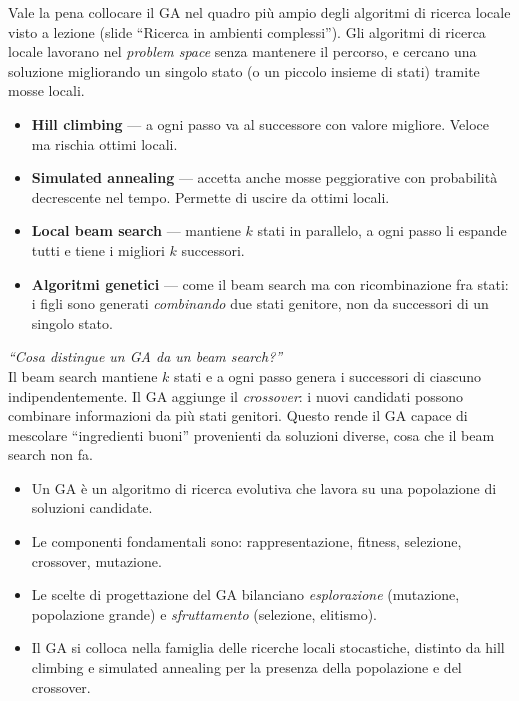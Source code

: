 \documentclass[11pt,a4paper]{article}
\begin{document}
Vale la pena collocare il GA nel quadro più ampio degli algoritmi di
ricerca locale visto a lezione (slide ``Ricerca in ambienti complessi'').
Gli algoritmi di ricerca locale lavorano nel \emph{problem space} senza
mantenere il percorso, e cercano una soluzione migliorando un singolo
stato (o un piccolo insieme di stati) tramite mosse locali.

\begin{itemize}
    \item \textbf{Hill climbing} --- a ogni passo va al successore con
          valore migliore. Veloce ma rischia ottimi locali.
    \item \textbf{Simulated annealing} --- accetta anche mosse peggiorative
          con probabilità decrescente nel tempo. Permette di uscire da
          ottimi locali.
    \item \textbf{Local beam search} --- mantiene $k$ stati in parallelo,
          a ogni passo li espande tutti e tiene i migliori $k$ successori.
    \item \textbf{Algoritmi genetici} --- come il beam search ma con
          ricombinazione fra stati: i figli sono generati \emph{combinando}
          due stati genitore, non da successori di un singolo stato.
\end{itemize}

\begin{domanda}
\textit{``Cosa distingue un GA da un beam search?''}\\
Il beam search mantiene $k$ stati e a ogni passo genera i successori di
ciascuno indipendentemente. Il GA aggiunge il \emph{crossover}: i nuovi
candidati possono combinare informazioni da più stati genitori. Questo
rende il GA capace di mescolare ``ingredienti buoni'' provenienti da
soluzioni diverse, cosa che il beam search non fa.
\end{domanda}

\begin{riassunto}
\begin{itemize}
    \item Un GA è un algoritmo di ricerca evolutiva che lavora su una popolazione di soluzioni candidate.
    \item Le componenti fondamentali sono: rappresentazione, fitness, selezione, crossover, mutazione.
    \item Le scelte di progettazione del GA bilanciano \emph{esplorazione} (mutazione, popolazione grande) e \emph{sfruttamento} (selezione, elitismo).
    \item Il GA si colloca nella famiglia delle ricerche locali stocastiche, distinto da hill climbing e simulated annealing per la presenza della popolazione e del crossover.
\end{itemize}
\end{riassunto}
\end{document}
